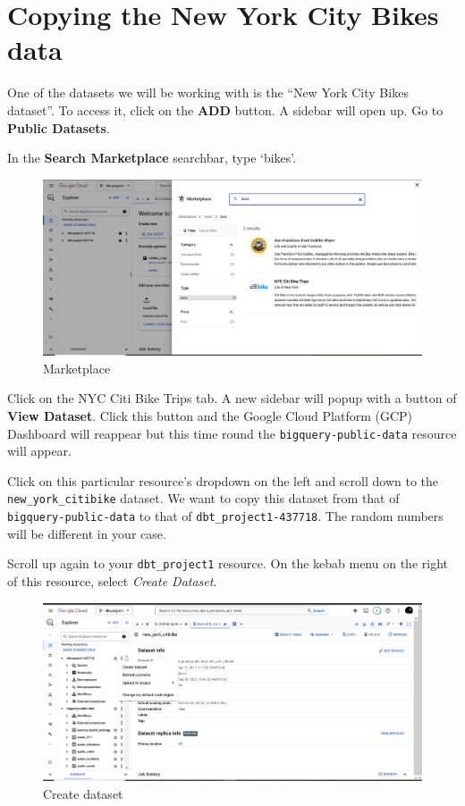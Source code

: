 \documentclass[
]{book}
\begin{document}
\hypertarget{copying-the-new-york-city-bikes-data}{%
\section{Copying the New York City Bikes data}\label{copying-the-new-york-city-bikes-data}}

One of the datasets we will be working with is the ``New York City Bikes dataset''. To access it, click on the \textbf{ADD} button. A sidebar will open up. Go to \textbf{Public Datasets}.

In the \textbf{Search Marketplace} searchbar, type `bikes'.

\begin{figure}
\centering
\includegraphics{./images/marketplace.png}
\caption{Marketplace}
\end{figure}

Click on the NYC Citi Bike Trips tab. A new sidebar will popup with a button of \textbf{View Dataset}. Click this button and the Google Cloud Platform (GCP) Dashboard will reappear but this time round the \texttt{bigquery-public-data} resource will appear.

Click on this particular resource's dropdown on the left and scroll down to the \texttt{new\_york\_citibike} dataset. We want to copy this dataset from that of \texttt{bigquery-public-data} to that of \texttt{dbt\_project1-437718}. The random numbers will be different in your case.

Scroll up again to your \texttt{dbt\_project1} resource. On the kebab menu on the right of this resource, select \emph{Create Dataset}.

\begin{figure}
\centering
\includegraphics{./images/create_dataset.png}
\caption{Create dataset}
\end{figure}
\end{document}
